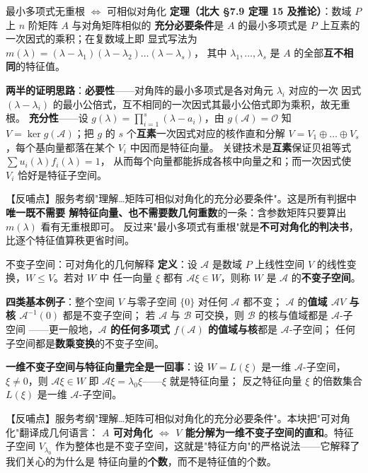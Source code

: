 \begin{fdeep}{最小多项式无重根 $\iff$ 可相似对角化}
\textbf{定理（北大 §7.9 定理 15 及推论）}：数域 $P$ 上 $n$ 阶矩阵 $A$ 与对角矩阵相似的
\textbf{充分必要条件}是 $A$ 的最小多项式是 $P$ 上互素的一次因式的乘积；在复数域上即
显式写法为 $m(\lambda)=(\lambda-\lambda_1)(\lambda-\lambda_2)\dots(\lambda-\lambda_s)$，
其中 $\lambda_1,\dots,\lambda_s$ 是 $A$ 的全部\textbf{互不相同}的特征值。

\textbf{两半的证明思路}：\textbf{必要性}——对角阵的最小多项式是各对角元 $\lambda_i$ 对应的一次
因式 $(\lambda-\lambda_i)$ 的最小公倍式，互不相同的一次因式其最小公倍式即为乘积，故无重根。
\textbf{充分性}——设 $g(\lambda)=\prod_{i=1}^{s}(\lambda-a_i)$，由 $g(\mathscr{A})=\mathscr{O}$ 知
$V=\ker g(\mathscr{A})$；把 $g$ 的 $s$ 个\textbf{互素}一次因式对应的核作直和分解
$V=V_1\oplus\dots\oplus V_s$，每个基向量都落在某个 $V_i$ 中因而是特征向量。
关键技术是\textbf{互素}保证贝祖等式 $\sum u_i(\lambda)f_i(\lambda)=1$，
从而每个向量都能拆成各核中向量之和；而一次因式使 $V_i$ 恰好是特征子空间。

【反哺点】服务考纲"理解…矩阵可相似对角化的充分必要条件"。这是所有判据中\textbf{唯一既不需要
解特征向量、也不需要数几何重数}的一条：含参数矩阵只要算出 $m(\lambda)$ 看有无重根即可。
反过来"最小多项式有重根"就是\textbf{不可对角化的判决书}，比逐个特征值算秩更省时间。
\end{fdeep}


\begin{fdeep}{不变子空间：可对角化的几何解释}
\textbf{定义}：设 $\mathscr{A}$ 是数域 $P$ 上线性空间 $V$ 的线性变换，$W\le V$。若对 $W$ 中
任一向量 $\xi$ 都有 $\mathscr{A}\xi\in W$，则称 $W$ 是 $\mathscr{A}$ 的\textbf{不变子空间}。

\textbf{四类基本例子}：整个空间 $V$ 与零子空间 $\{0\}$ 对任何 $\mathscr{A}$ 都不变；
$\mathscr{A}$ 的\textbf{值域 $\mathscr{A}V$ 与核 $\mathscr{A}^{-1}(0)$} 都是不变子空间；
若 $\mathscr{A}$ 与 $\mathscr{B}$ 可交换，则 $\mathscr{B}$ 的核与值域都是 $\mathscr{A}$-子空间
——更一般地，\textbf{$\mathscr{A}$ 的任何多项式 $f(\mathscr{A})$ 的值域与核}都是 $\mathscr{A}$-子空间；
任何子空间都是\textbf{数乘变换}的不变子空间。

\textbf{一维不变子空间与特征向量完全是一回事}：设 $W=L(\xi)$ 是一维 $\mathscr{A}$-子空间，
$\xi\ne0$，则 $\mathscr{A}\xi\in W$ 即 $\mathscr{A}\xi=\lambda_0\xi$——$\xi$ 就是特征向量；
反之特征向量 $\xi$ 的倍数集合 $L(\xi)$ 是一维 $\mathscr{A}$-子空间。

【反哺点】服务考纲"理解…矩阵可相似对角化的充分必要条件"。本块把"可对角化"翻译成几何语言：
\textbf{$A$ 可对角化 $\iff$ $V$ 能分解为一维不变子空间的直和}。特征子空间 $V_{\lambda_0}$
作为整体也是不变子空间，这就是"特征方向"的严格说法——它解释了我们关心的为什么是
特征向量的\textbf{个数}，而不是特征值的个数。
\end{fdeep}

